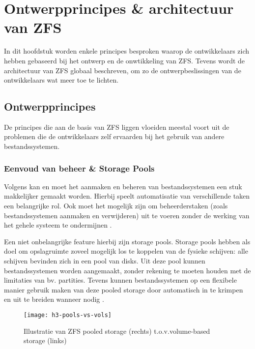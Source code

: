 
\chapter{Ontwerpprincipes \& architectuur van ZFS}
\label{ch:h3}

In dit hoofdstuk worden enkele principes besproken waarop de ontwikkelaars zich hebben gebaseerd bij het ontwerp en de onwtikkeling van ZFS. Tevens wordt de architectuur van ZFS globaal beschreven, om zo de ontwerpbeslissingen van de ontwikkelaars wat meer toe te lichten.

\section{Ontwerpprincipes}

De principes die aan de basis van ZFS liggen vloeiden meestal voort uit de problemen die de ontwikkelaars zelf ervaarden bij het gebruik van andere bestandssystemen.

\subsection{Eenvoud van beheer \& Storage Pools}

Volgens \textcite{ZFSBonwick} kan en moet het aanmaken en beheren van bestandssystemen een stuk makkelijker gemaakt worden. Hierbij speelt automatisatie van verschillende taken een belangrijke rol. Ook moet het mogelijk zijn om beheerderstaken (zoals bestandssystemen aanmaken en verwijderen) uit te voeren zonder de werking van het gehele systeem te ondermijnen \autocite{ZFSBonwick}. 

Een niet onbelangrijke feature hierbij zijn storage pools. Storage pools hebben als doel om opslagruimte zoveel mogelijk los te koppelen van de fysieke schijven: alle schijven bevinden zich in een pool van disks. Uit deze pool kunnen bestandssystemen worden aangemaakt, zonder rekening te moeten houden met de limitaties van bv. partities. Tevens kunnen bestandssystemen op een flexibele manier gebruik maken van deze pooled storage door automatisch in te krimpen en uit te breiden wanneer nodig \autocite{ZFSBonwick}. 

\begin{figure}
        \centering
        \texttt{[image: h3-pools-vs-vols]}
        \caption{Illustratie van ZFS pooled storage (rechts) t.o.v.volume-based storage (links) \autocite{ZFSBonwick}}
        \label{fig:bonwick_pools_illustratie}
\end{figure}
  
